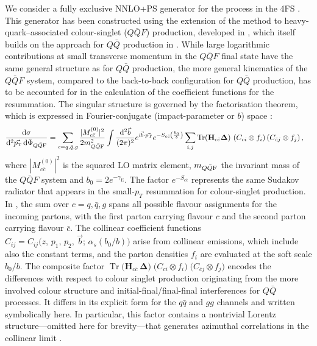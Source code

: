 \documentclass[11pt,a4paper]{article}
\DeclareMathOperator{\Tr}{Tr}
\begin{document}
We consider a fully exclusive NNLO+PS generator for the \bbH{} process in the 4FS \cite{Biello:2024pgo}.  This generator has been constructed using 
the extension of the \minnlo{} method to heavy-quark–associated colour-singlet ($Q\bar{Q}F$) production, developed in , 
which itself builds on the \minnlo{} approach for $Q\bar{Q}$ production in . 
While large logarithmic contributions at small transverse momentum in the $Q\bar{Q}F$ final state have the same 
general structure as for $Q\bar{Q}$ production, the more general kinematics of the $Q\bar{Q}F$ system, compared to the back-to-back configuration
for $Q\bar Q$ production, has to be accounted for in the calculation of the coefficient functions for the resummation. The singular structure is governed
by the factorisation theorem, which is expressed in Fourier-conjugate (impact-parameter or $b$) space \cite{Zhu:2012ts,Li:2013mia,Catani:2014qha,Catani:2018mei}:
\begin{align}\label{eq:facformula}
        \frac{\mathd \sigma}{ \mathd^2\vec{\pt}\, \mathd \Phi_{Q\bar{Q}{\rm F}}}&=\sum_{c=q,\bar{q},g}
  \frac{|M^{(0)}_{c\bar{c}}|^2}{2 m_{Q\bar{Q}{\rm F}}^2 }\int\frac{ \mathd^2\vec{b}}{(2\pi)^2} e^{i \vec{b}\cdot
  \vec{\pt} } e^{-S_{c\bar{c}} \left(\frac{b_0}{b}\right)}\sum_{i,j} \Tr({\mathbf H}_{c\bar{c}}{\mathbf \Delta})\,\,
  ({C}_{ci}\otimes f_i) \,({C}_{\bar{c} j}\otimes f_j) \,,
\end{align}
where $|M^{(0)}_{c\bar{c}}|^2$ is the squared LO matrix element,
$m_{Q\bar{Q}{\rm F}}$ the invariant mass of the $Q\bar{Q}F$  system and $b_0=2 e^{-\gamma_\text{E}}$. The factor $e^{-S_{c\bar{c}}}$ represents the same Sudakov radiator that appears in the small-$p_{T}$ resummation for 
colour-singlet production.  In , the sum over $c=q,\bar{q},g$ spans all possible flavour assignments for the incoming partons, with the first parton carrying flavour $c$ and the second parton carrying flavour $\bar{c}$. The collinear coefficient functions
$C_{ij} = C_{ij}\bigl(z,\,p_{1},\,p_{2},\,\vec{b};\,\alpha_{s}(b_{0}/b)\bigr)$ arise from collinear emissions, which include
also the constant terms, and the parton densities $f_{i}$ are evaluated at the soft scale $b_{0}/b$.  The composite factor
$\Tr\bigl({\mathbf H}_{c\bar{c}}\,{\mathbf \Delta}\bigr)\;\bigl(C_{ci}\otimes f_{i}\bigr)\;\bigl(C_{\bar{c}j}\otimes f_{j}\bigr)$
encodes the differences with respect to colour singlet production originating from the more involved colour structure 
and initial-final/final-final interferences for $Q\bar{Q}$ processes. It differs in its explicit form for the $q\bar{q}$ and $gg$ channels and written symbolically here.
 In particular, this factor contains a nontrivial Lorentz structure—omitted here for brevity—that generates azimuthal correlations in the collinear limit \cite{Catani:2010pd,Catani:2014qha}.
\end{document}
